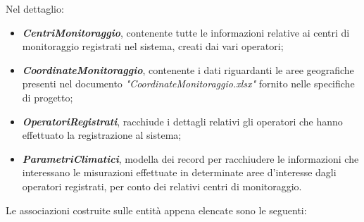 Nel dettaglio:
\begin{itemize}
	\item \textbf{\textit{CentriMonitoraggio}}, contenente tutte le informazioni relative ai centri di monitoraggio registrati nel sistema, creati dai vari operatori;
	\item \textbf{\textit{CoordinateMonitoraggio}}, contenente i dati riguardanti le aree geografiche presenti nel documento \textit{"CoordinateMonitoraggio.xlsx"} fornito nelle specifiche di progetto;
	\item \textbf{\textit{OperatoriRegistrati}}, racchiude i dettagli relativi gli operatori che hanno effettuato la registrazione al sistema;
	\item \textbf{\textit{ParametriClimatici}}, modella dei record per racchiudere le informazioni che interessano le misurazioni effettuate in determinate aree d'interesse dagli operatori registrati, per conto dei relativi centri di monitoraggio.
\end{itemize}
\pagebreak
Le associazioni costruite sulle entità appena elencate sono le seguenti:
